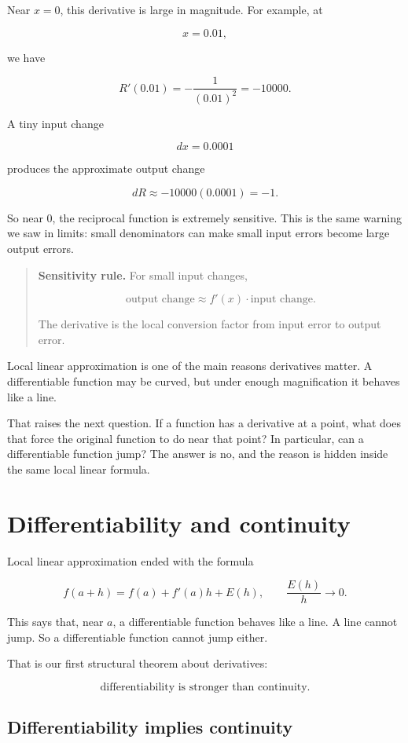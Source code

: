Near \(x=0\), this derivative is large in magnitude.  For example, at

\[
x=0.01,
\]

we have

\[
R'(0.01)=-\frac{1}{(0.01)^2}=-10000.
\]

A tiny input change

\[
dx=0.0001
\]

produces the approximate output change

\[
dR\approx -10000(0.0001)=-1.
\]

So near \(0\), the reciprocal function is extremely sensitive.  This is the same warning we saw in limits: small denominators can make small input errors become large output errors.

\begin{quote}
\textbf{Sensitivity rule.}
For small input changes,

\[
\boxed{
\text{output change}\approx f'(x)\cdot \text{input change}.
}
\]

The derivative is the local conversion factor from input error to output error.
\end{quote}

Local linear approximation is one of the main reasons derivatives matter.  A differentiable function may be curved, but under enough magnification it behaves like a line.

That raises the next question.  If a function has a derivative at a point, what does that force the original function to do near that point?  In particular, can a differentiable function jump?  The answer is no, and the reason is hidden inside the same local linear formula.
\section{Differentiability and continuity}
\label{sec:differentiability-continuity}

Local linear approximation ended with the formula

\[
f(a+h)=f(a)+f'(a)h+E(h),
\qquad
\frac{E(h)}{h}\to0.
\]

This says that, near \(a\), a differentiable function behaves like a line.  A line cannot jump.  So a differentiable function cannot jump either.

That is our first structural theorem about derivatives:

\[
\text{differentiability is stronger than continuity.}
\]

\subsection{Differentiability implies continuity}
\label{subsec:differentiability-implies-continuity}

